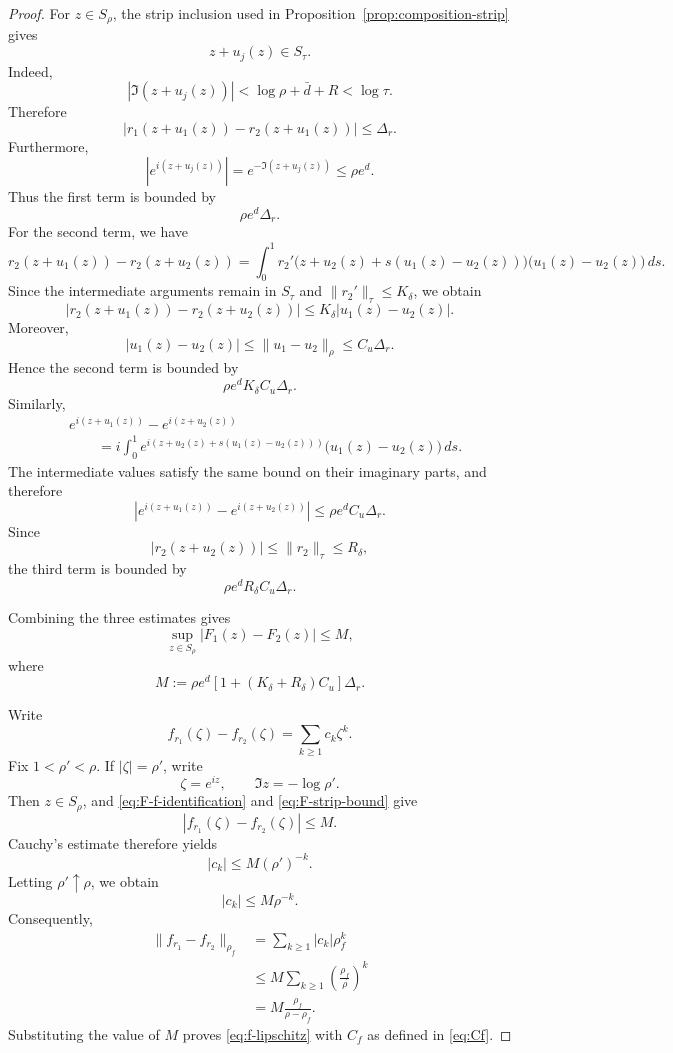 \documentclass[10pt,a4paper]{amsart}
\begin{document}
\begin{proof}
	For $z\in S_\rho$, the strip inclusion used in
	Proposition~\ref{prop:composition-strip} gives
	\[
	z+u_j(z)\in S_\tau.
	\]
	Indeed,
	\[
	|\Im(z+u_j(z))|
	<
	\log\rho+\bar d+R
	<
	\log\tau.
	\]
	Therefore
	\[
	|r_1(z+u_1(z))-r_2(z+u_1(z))|
	\le
	\Delta_r.
	\]
	Furthermore,
	\[
	|e^{i(z+u_j(z))}|
	=
	e^{-\Im(z+u_j(z))}
	\le
	\rho e^d.
	\]
	Thus the first term is bounded by
	\[
	\rho e^d\Delta_r.
	\]
	For the second term, we have
	\[r_2(z+u_1(z))-r_2(z+u_2(z))=
		\int_0^1 r_2'\bigl(z+u_2(z)+s(u_1(z)-u_2(z))\bigr)
		\bigl(u_1(z)-u_2(z)\bigr)\,ds .
	\]
	Since the intermediate arguments remain in $S_\tau$ and
	$\|r_2'\|_\tau\le K_\delta$, we obtain
	\[
	|r_2(z+u_1(z))-r_2(z+u_2(z))|
	\le
	K_\delta |u_1(z)-u_2(z)|.
	\]
	Moreover,
	\[
	|u_1(z)-u_2(z)|
	\le
	\|u_1-u_2\|_\rho
	\le
	C_u\Delta_r.
	\]
	Hence the second term is bounded by
	\[
	\rho e^d K_\delta C_u\Delta_r.
	\]
	Similarly,
	\[
	\begin{aligned}
		&e^{i(z+u_1(z))}-e^{i(z+u_2(z))}
		\\
		&\qquad =
		i\int_0^1
		e^{i(z+u_2(z)+s(u_1(z)-u_2(z)))}
		\bigl(u_1(z)-u_2(z)\bigr)\,ds .
	\end{aligned}
	\]
	The intermediate values satisfy the same bound on their imaginary
	parts, and therefore
	\[
	\left|
	e^{i(z+u_1(z))}-e^{i(z+u_2(z))}
	\right|
	\le
	\rho e^d C_u\Delta_r.
	\]
	Since
	\[
	|r_2(z+u_2(z))|
	\le
	\|r_2\|_\tau
	\le
	R_\delta,
	\]
	the third term is bounded by
	\[
	\rho e^d R_\delta C_u\Delta_r.
	\]
	
	Combining the three estimates gives
	\begin{equation}\label{eq:F-strip-bound}
		\sup_{z\in S_\rho}
		|F_1(z)-F_2(z)|
		\le
		M,
	\end{equation}
	where
	\[
	M
	:=
	\rho e^d
	\left[
	1+(K_\delta+R_\delta)C_u
	\right]\Delta_r.
	\]
	
	Write
	\[
	f_{r_1}(\zeta)-f_{r_2}(\zeta)
	=
	\sum_{k\ge1}c_k\zeta^k.
	\]
	Fix $1<\rho'<\rho$.  If $|\zeta|=\rho'$, write
	\[
	\zeta=e^{iz},
	\qquad
	\Im z=-\log\rho'.
	\]
	Then $z\in S_\rho$, and \eqref{eq:F-f-identification} and
	\eqref{eq:F-strip-bound} give
	\[
	|f_{r_1}(\zeta)-f_{r_2}(\zeta)|
	\le M.
	\]
	Cauchy's estimate therefore yields
	\[
	|c_k|\le M(\rho')^{-k}.
	\]
	Letting $\rho'\uparrow\rho$, we obtain
	\[
	|c_k|\le M\rho^{-k}.
	\]
	Consequently,
	\[
	\begin{aligned}
		\|f_{r_1}-f_{r_2}\|_{\rho_f}
		&=
		\sum_{k\ge1}|c_k|\rho_f^k
		\\
		&\le
		M\sum_{k\ge1}
		\left(\frac{\rho_f}{\rho}\right)^k
		\\
		&=
		M\frac{\rho_f}{\rho-\rho_f}.
	\end{aligned}
	\]
	Substituting the value of $M$ proves
	\eqref{eq:f-lipschitz} with $C_f$ as defined in
	\eqref{eq:Cf}.
\end{proof}
\end{document}

